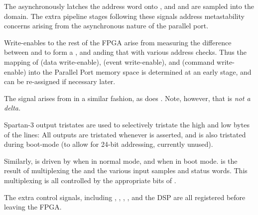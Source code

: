   
The  asynchronously latches the address word onto
, and  and  are sampled into
the  domain. The extra pipeline stages following these
signals address metastability concerns arising from the asynchronous
nature of the parallel port.
  
Write-enables to the rest of the FPGA arise from measuring the
difference between  and  to form a
, and anding that with various address checks. Thus
the mapping of  (data write-enable),  (event
write-enable), and  (command write-enable) into the
Parallel Port memory space is determined at an early stage, and can be
re-assigned if necessary later.
    
The signal  arises from  in a similar
fashion, as does . Note, however, that  is
\em{not} a delta.
  
Spartan-3 output tristates are used to selectively tristate the high
and low bytes of the  lines: All outputs are tristated
whenever  is asserted, and  is also
tristated during boot-mode (to allow for 24-bit addressing, currently
unused).
  
Similarly,  is driven by  when in
normal mode, and  when in boot mode. is
the result of multiplexing the  and the various
input samples and status words. This multiplexing is all controlled by
the appropriate bits of .


The extra control signals, including , ,
, , and the DSP  are all
registered before leaving the FPGA.
    


